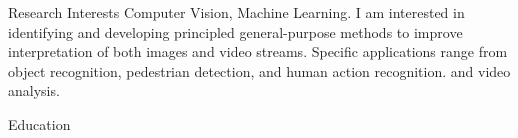 \documentclass{resume}
\begin{document}
\maketitle
\thispagestyle{empty} %

\vspace{-0.5em}

\begin{comment}
\begin{component}{Intended Program of Study}
Electrical Engineering: Systems Ph.D.  \hfill \textbf{U-M ID}: 38829826
\end{component}
\end{comment}

\begin{component}{Research Interests}
Computer Vision, Machine Learning.
I am interested in identifying and developing principled general-purpose methods to
improve interpretation of both images and video streams. 
Specific applications range from object 
recognition, pedestrian detection, and human action recognition. 
and video analysis.
\end{component}

\vspace{0.5em}

\begin{component}{Education}
    
\end{component}

\vspace{0.5em}
\end{document}
